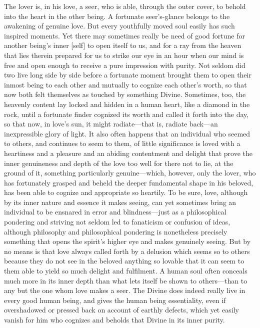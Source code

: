 \documentclass[12pt,a4paper]{book}
\begin{document}
The lover is, in his love, a seer, who is able, through the outer cover,
to behold into the heart in the other being. A fortunate seer's-glance
belongs to the awakening of genuine love. But every youthfully moved soul
easily has such inspired moments. Yet there may sometimes really be need of
good fortune for another being's inner [self] to open itself to us, and
for a ray from the heaven that lies therein prepared for us to strike our
eye in an hour when our mind is free and open enough to receive a pure
impression with purity. Not seldom did two live long side by side before a
fortunate moment brought them to open their inmost being to each other and
mutually to cognize each other's worth, so that now both felt themselves
as touched by something Divine. Sometimes, too, the heavenly content lay
locked and hidden in a human heart, like a diamond in the rock, until a
fortunate finder cognized its worth and called it forth into the day, so
that now, in love's sun, it might radiate---that is, radiate back---an
inexpressible glory of light. It also often happens that an individual who
seemed to others, and continues to seem to them, of little significance is
loved with a heartiness and a pleasure and an abiding contentment and
delight that prove the inner genuineness and depth of the love too well
for there not to lie, at the ground of it, something particularly
genuine---which, however, only the lover, who has fortunately grasped and
beheld the deeper fundamental shape in his beloved, has been able to
cognize and appropriate so heartily. To be sure, love, although by its
inner nature and essence it makes seeing, can yet sometimes bring an
individual to be ensnared in error and blindness---just as a philosophical
pondering and striving not seldom led to fanaticism or confusion of ideas,
although philosophy and philosophical pondering is nonetheless precisely
something that opens the spirit's higher eye and makes genuinely seeing.
But by no means is that love always called forth by a delusion which seems
so to others because they do not see in the beloved anything so lovable
that it can seem to them able to yield so much delight and fulfilment. A
human soul often conceals much more in its inner depth than what lets
itself be shown to others---than to any but the one whom love makes a seer.
The Divine does indeed really live in every good human being, and gives
the human being essentiality, even if overshadowed or pressed back on
account of earthly defects, which yet easily vanish for him who cognizes
and beholds that Divine in its inner purity.
\end{document}
